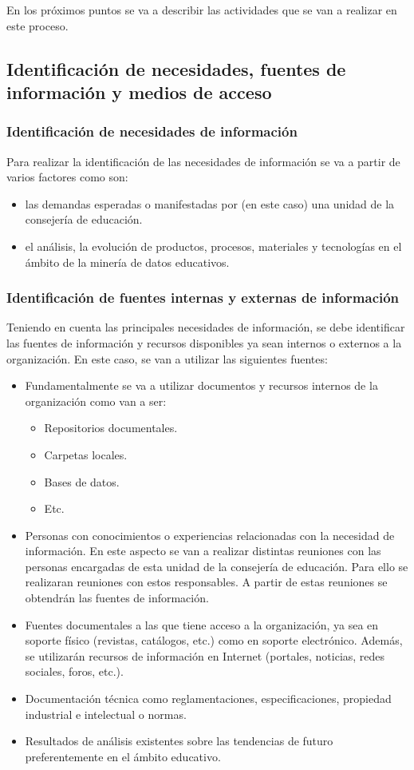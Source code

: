 En los próximos puntos se va a describir las actividades que se van a realizar en este proceso.

\subsection{Identificación de necesidades, fuentes de información y medios de acceso}
\subsubsection{Identificación de necesidades de información}
Para realizar la identificación de las necesidades de información se va a partir de varios factores como son:
\begin{itemize}
\item las demandas esperadas o manifestadas por (en este caso) una unidad de la consejería de educación.
\item el análisis, la evolución de productos, procesos, materiales y tecnologías en el ámbito de la minería de datos educativos.
\end{itemize}

\subsubsection{Identificación de fuentes internas y externas de información}
Teniendo en cuenta las principales necesidades de información, se debe identificar las fuentes de información y recursos disponibles ya sean internos o externos a la organización. En este caso, se van a utilizar las siguientes fuentes:
\begin{itemize}
\item Fundamentalmente se va a utilizar documentos y recursos internos de la organización como van a ser:
\begin{itemize}
\item Repositorios documentales.
\item Carpetas locales.
\item Bases de datos.
\item Etc.
\end{itemize}
\item Personas con conocimientos o experiencias relacionadas con la necesidad de información. En este aspecto se van a realizar distintas reuniones con las personas encargadas de esta unidad de la consejería de educación. Para ello se realizaran reuniones con estos responsables. A partir de estas reuniones se obtendrán las fuentes de información.
\item Fuentes documentales a las que tiene acceso a la organización, ya sea en soporte físico (revistas, catálogos, etc.) como en soporte electrónico. Además, se utilizarán recursos de información en Internet (portales, noticias, redes sociales, foros, etc.). 
\item Documentación técnica como reglamentaciones, especificaciones, propiedad industrial e intelectual o normas.
\item Resultados de análisis existentes sobre las tendencias de futuro preferentemente en el ámbito educativo.
\end{itemize}

